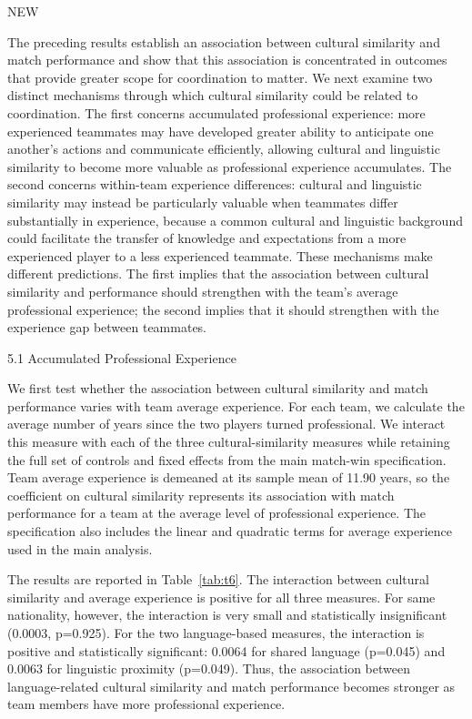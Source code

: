 \documentclass[10pt]{article}
\begin{document}
NEW

The preceding results establish an association between cultural similarity and match performance and show that this association is concentrated in outcomes that provide greater scope for coordination to matter. We next examine two distinct mechanisms through which cultural similarity could be related to coordination. The first concerns accumulated professional experience: more experienced teammates may have developed greater ability to anticipate one another's actions and communicate efficiently, allowing cultural and linguistic similarity to become more valuable as professional experience accumulates. The second concerns within-team experience differences: cultural and linguistic similarity may instead be particularly valuable when teammates differ substantially in experience, because a common cultural and linguistic background could facilitate the transfer of knowledge and expectations from a more experienced player to a less experienced teammate. These mechanisms make different predictions. The first implies that the association between cultural similarity and performance should strengthen with the team's average professional experience; the second implies that it should strengthen with the experience gap between teammates.

5.1 Accumulated Professional Experience

We first test whether the association between cultural similarity and match performance varies with team average experience. For each team, we calculate the average number of years since the two players turned professional. We interact this measure with each of the three cultural-similarity measures while retaining the full set of controls and fixed effects from the main match-win specification. Team average experience is demeaned at its sample mean of 11.90 years, so the coefficient on cultural similarity represents its association with match performance for a team at the average level of professional experience. The specification also includes the linear and quadratic terms for average experience used in the main analysis.

The results are reported in Table~\ref{tab:t6}. The interaction between cultural similarity and average experience is positive for all three measures. For same nationality, however, the interaction is very small and statistically insignificant (0.0003, p=0.925). For the two language-based measures, the interaction is positive and statistically significant: 0.0064 for shared language (p=0.045) and 0.0063 for linguistic proximity (p=0.049). Thus, the association between language-related cultural similarity and match performance becomes stronger as team members have more professional experience.
\end{document}
